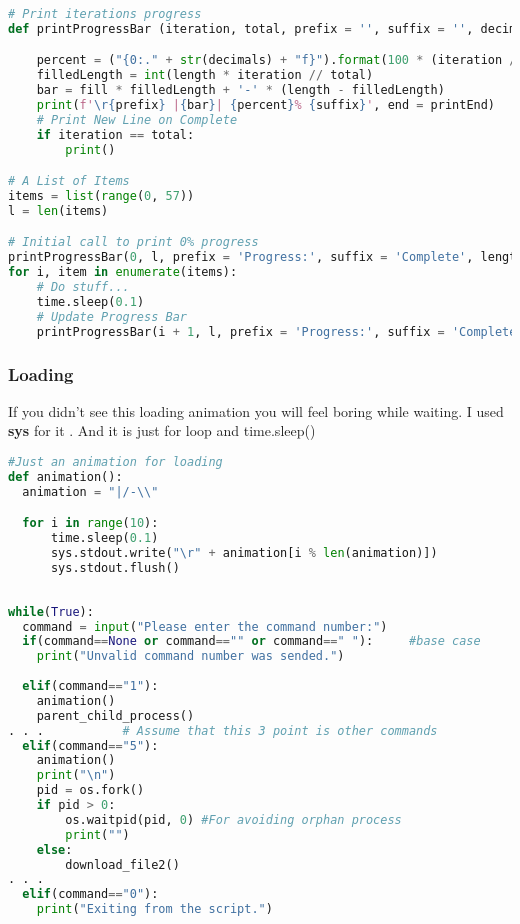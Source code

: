 \documentclass[onecolumn]{article}
\begin{document}
\begin{lstlisting}[language=Python, caption=Loading Animation]
# Print iterations progress
def printProgressBar (iteration, total, prefix = '', suffix = '', decimals = 1, length = 100, fill = '█', printEnd = "\r"):

    percent = ("{0:." + str(decimals) + "f}").format(100 * (iteration / float(total)))
    filledLength = int(length * iteration // total)
    bar = fill * filledLength + '-' * (length - filledLength)
    print(f'\r{prefix} |{bar}| {percent}% {suffix}', end = printEnd)
    # Print New Line on Complete
    if iteration == total: 
        print()

# A List of Items
items = list(range(0, 57))
l = len(items)

# Initial call to print 0% progress
printProgressBar(0, l, prefix = 'Progress:', suffix = 'Complete', length = 50)
for i, item in enumerate(items):
    # Do stuff...
    time.sleep(0.1)
    # Update Progress Bar
    printProgressBar(i + 1, l, prefix = 'Progress:', suffix = 'Complete', length = 50)
    \end{lstlisting}
    
\subsubsection{Loading}
If you didn't see this loading animation you will feel boring while waiting. I used \textbf{sys} for it . And it is just for loop and time.sleep()

\begin{lstlisting}[language=Python, caption=Loading Animation]
#Just an animation for loading 
def animation():
  animation = "|/-\\" 

  for i in range(10):
      time.sleep(0.1)
      sys.stdout.write("\r" + animation[i % len(animation)])
      sys.stdout.flush()
  
\end{lstlisting}



\begin{lstlisting}[language=Python, caption=Driver Code ]
while(True):
  command = input("Please enter the command number:")
  if(command==None or command=="" or command==" "):     #base case
    print("Unvalid command number was sended.")
 
  elif(command=="1"):
    animation()
    parent_child_process()
. . .           # Assume that this 3 point is other commands 
  elif(command=="5"):
    animation()
    print("\n")
    pid = os.fork() 
    if pid > 0: 
        os.waitpid(pid, 0) #For avoiding orphan process 
        print("")    
    else: 
        download_file2()
. . .   
  elif(command=="0"):
    print("Exiting from the script.")
    \end{lstlisting}
\end{document}
